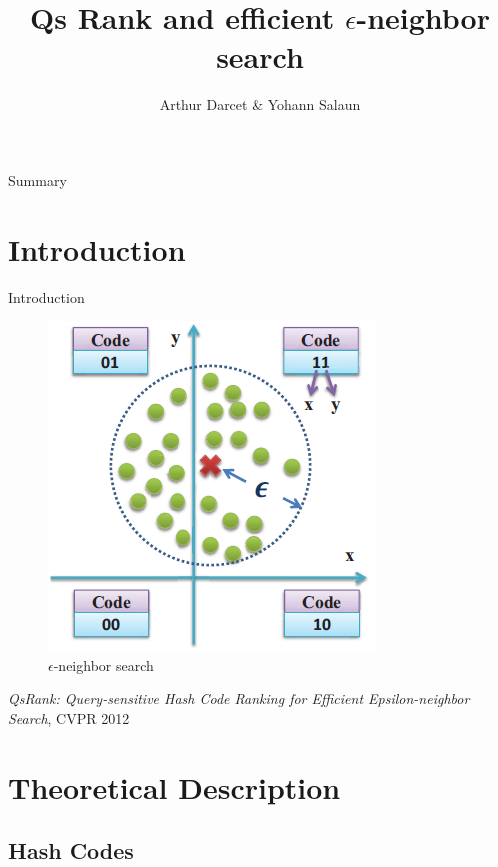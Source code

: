 \documentclass[english]{beamer}
\title[Qs Rank and efficient $\epsilon$-neighbor search]{Qs Rank and efficient $\epsilon$-neighbor search}
\author[Arthur Darcet \& Yohann Salaun] 
{Arthur Darcet \& Yohann Salaun}
\theoremstyle{plain}
\theoremstyle{remark}
\begin{document}
\begin{frame}
  \titlepage
\end{frame}

\begin{frame}{Summary}
  \tableofcontents
\end{frame}


\section{Introduction}

\begin{frame}{Introduction}
\begin{figure}[htbp]
	\begin{center}
	\includegraphics[width=.4\linewidth]{Images/intro.png}
	\caption{$\epsilon$-neighbor search}
	\end{center}
	\label{fig:intro}
\end{figure}
\emph{QsRank: Query-sensitive Hash Code Ranking for Efficient Epsilon-neighbor Search}, CVPR 2012

\end{frame}

\section{Theoretical Description}

\subsection{Hash Codes}
\end{document}
